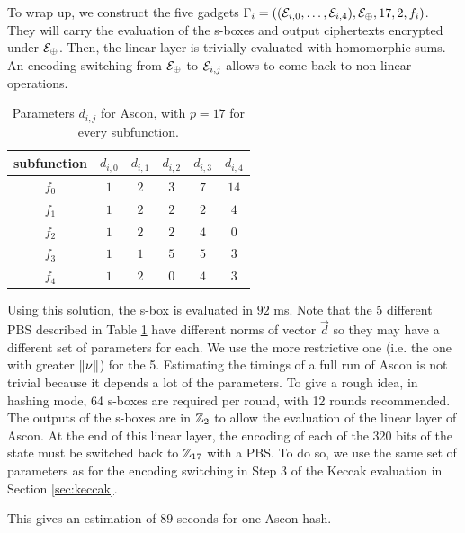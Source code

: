 To wrap up, we construct the five gadgets $\Gamma_i = \left ( (\mathcal{E}_{i,0}, \dots,  \mathcal{E}_{i, 4}), \mathcal{E}_\oplus, 17, 2, f_i \right )$. They will carry the evaluation of the s-boxes and output ciphertexts encrypted under $\mathcal{E}_\oplus$. Then, the linear layer is trivially evaluated with homomorphic sums. An encoding switching from $\mathcal{E}_\oplus$ to $\mathcal{E}_{i, j}$ allows to come back to non-linear operations.




\begin{table}[]
    \centering
    \begin{tabular}{|c|c|c|c|c|c|}
        \hline
       subfunction & $d_{i, 0}$ & $d_{i, 1}$ & $d_{i, 2}$ & $d_{i, 3}$ & $d_{i, 4}$\\
        \hline
        $f_0$  & $1$ & $2$ & $3$ & $7$ & $14$\\
        \hline
        $f_1$ & $1$ & $2$ & $2$ & $2$ & $4$\\
        \hline
        $f_2$ & $1$ & $2$ & $2$ & $4$ & $0$\\
        \hline
        $f_3$ & $1$ & $1$ & $5$ & $5$ & $3$\\
        \hline
        $f_4$ & $1$ & $2$ & $0$ & $4$ & $3$\\
        \hline
     \end{tabular}
    \caption{Parameters $d_{i, j}$ for Ascon, with $p=17$ for every subfunction.}
    \label{tab:encodings_ascon}
\end{table}


Using this solution, the s-box is evaluated in $92$ ms. Note that the 5 different PBS described in Table \ref{tab:encodings_ascon} have different norms of vector $\vec d$ so they may have a different set of parameters for each. We use the more restrictive one (i.e. the one with greater $\lVert \nu \rVert$) for the 5. Estimating the timings of a full run of Ascon is not trivial because it depends a lot of the parameters. To give a rough idea, in hashing mode, 64 s-boxes are required per round, with 12 rounds recommended. The outputs of the s-boxes are in $\mathbb{Z}_2$ to allow the evaluation of the linear layer of Ascon. At the end of this linear layer, the encoding of each of the 320 bits of the state must be switched back to $\mathbb{Z}_{17}$ with a PBS. To do so, we use the same set of parameters as for the encoding switching in Step 3 of the Keccak evaluation in Section \ref{sec:keccak}.

This gives an estimation of $89$ seconds for one Ascon hash.

